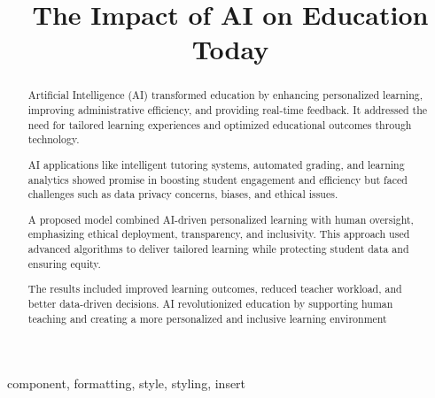 \documentclass[conference]{IEEEtran}
\begin{document}
\title{The Impact of AI on Education Today\\
}

\author{
}

\maketitle

\begin{abstract}
Artificial Intelligence (AI) transformed education by enhancing personalized learning, improving administrative efficiency, and providing real-time feedback. It addressed the need for tailored learning experiences and optimized educational outcomes through technology.

AI applications like intelligent tutoring systems, automated grading, and learning analytics showed promise in boosting student engagement and efficiency but faced challenges such as data privacy concerns, biases, and ethical issues.

A proposed model combined AI-driven personalized learning with human oversight, emphasizing ethical deployment, transparency, and inclusivity. This approach used advanced algorithms to deliver tailored learning while protecting student data and ensuring equity.

The results included improved learning outcomes, reduced teacher workload, and better data-driven decisions. AI revolutionized education by supporting human teaching and creating a more personalized and inclusive learning environment
\end{abstract}

\begin{IEEEkeywords}
component, formatting, style, styling, insert
\end{IEEEkeywords}
\end{document}
